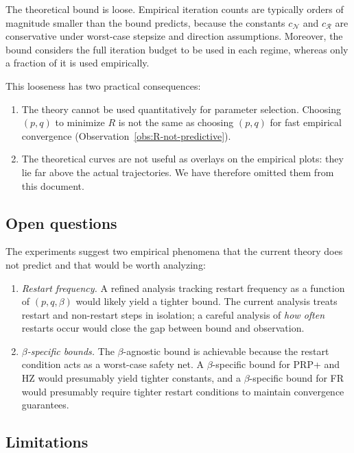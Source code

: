 \documentclass[11pt,a4paper]{article}
\theoremstyle{plain}
\theoremstyle{definition}
\newcommand{\setN}{\mathcal{N}}
\newcommand{\setR}{\mathcal{R}}
\begin{document}
The theoretical bound is loose. Empirical iteration counts are typically orders of magnitude smaller than the bound predicts, because the constants $c_\setN$ and $c_\setR$ are conservative under worst-case stepsize and direction assumptions. Moreover, the bound considers the full iteration budget to be used in each regime, whereas only a fraction of it is used empirically.

This looseness has two practical consequences:
\begin{enumerate}[leftmargin=2em]
  \item The theory cannot be used quantitatively for parameter selection. Choosing $(p, q)$ to minimize $R$ is not the same as choosing $(p, q)$ for fast empirical convergence (Observation~\ref{obs:R-not-predictive}).
  \item The theoretical curves are not useful as overlays on the empirical plots: they lie far above the actual trajectories. We have therefore omitted them from this document.
\end{enumerate}

\subsection{Open questions}\label{subsec:disc-open}

The experiments suggest two empirical phenomena that the current theory does not predict and that would be worth analyzing:
\begin{enumerate}[leftmargin=2em]
  \item \emph{Restart frequency.} A refined analysis tracking restart frequency as a function of $(p, q, \beta)$ would likely yield a tighter bound. The current analysis treats restart and non-restart steps in isolation; a careful analysis of \emph{how often} restarts occur would close the gap between bound and observation.
  \item \emph{$\beta$-specific bounds.} The $\beta$-agnostic bound is achievable because the restart condition acts as a worst-case safety net. A $\beta$-specific bound for PRP+ and HZ would presumably yield tighter constants, and a $\beta$-specific bound for FR would presumably require tighter restart conditions to maintain convergence guarantees.
\end{enumerate}

\subsection{Limitations}\label{subsec:disc-limits}
\end{document}
